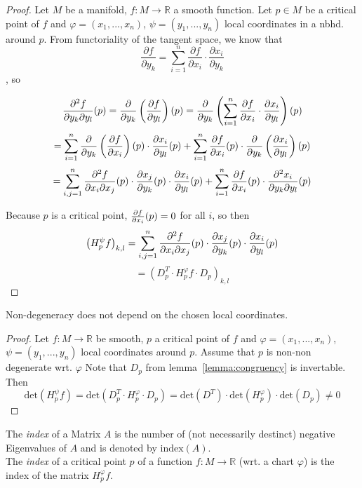 \documentclass[a4paper,11pt]{article}
\begin{document}
\begin{proof}

   Let $M$ be a manifold, $f: M \rightarrow \mathbb{R}$ a smooth function.
   Let $p \in M$ be a critical point of $f$ and $\varphi = (x_1, ..., x_n)$, $\psi = (y_1, ..., y_n)$
   local coordinates in a nbhd. around $p$.
   From functoriality of the tangent space, we know that 
   \[ \frac{\partial f}{\partial y_k} = \sum_{i=1}^n \frac{\partial f}{\partial x_i} \cdot \frac{\partial x_i}{\partial y_k} \]
   , so 

   \[ \pdderive[f]{y_k}{y_l} (p) 
   = \pderive{y_k} \left( \pderive[f]{y_l} \right) (p) 
   = \pderive{y_k} \left( \sum_{i=1}^n \pderive[f]{x_i} \cdot \pderive[x_i]{y_l} \right) (p) \]
   \[ = \sum_{i=1}^n \pderive{y_k} \left( \pderive[f]{x_i} \right) (p) \cdot \pderive[x_i]{y_l} (p) 
   + \sum_{i=1}^n \pderive[f]{x_i} (p) \cdot \pderive{y_k} \left( \pderive[x_i]{y_l} \right) (p) \]
   \[ = \sum_{i,j = 1}^n \pdderive[f]{x_i}{x_j} (p) \cdot \pderive[x_j]{y_k} (p) \cdot \pderive[x_i]{y_l}(p)
   + \sum_{i=1}^n \pderive[f]{x_i} (p) \cdot \pdderive[x_i]{y_k}{y_l}(p)\]
   
   Because $p$ is a critical point, $\pderive[f]{x_i} (p) = 0$ for all $i$, so then
   \[ \left( H_p^{\psi}f \right)_{k,l} = \sum_{i,j = 1}^n \pdderive[f]{x_i}{x_j} (p) \cdot \pderive[x_j]{y_k}(p) \cdot \pderive[x_i]{y_l} (p) \]
   \[ = \left( D_p^T \cdot H_p^{\varphi}f \cdot D_p \right)_{k,l} \]

\end{proof}

\begin{lemma} 
   \label{lemma:non-degeneracy}
   Non-degeneracy does not depend on the chosen local coordinates.
\end{lemma}

\begin{proof}
   Let $f: M \rightarrow \mathbb{R}$ be smooth, $p$ a critical point of $f$ and $\varphi = (x_1, ..., x_n)$, $\psi = (y_1, ..., y_n)$ 
   local coordinates around $p$. Assume that $p$ is non-non degenerate wrt. $\varphi$ Note that $D_p$ from lemma~\ref{lemma:congruency} is invertable. Then
   \[ \text{det}(H_p^{\psi}f) = \text{det}(D_p^T \cdot H_p^{\varphi} \cdot D_p) = \text{det}(D^T) \cdot \text{det}(H_p^{\varphi}) \cdot \text{det}(D_p) \neq 0 \]
\end{proof}

\begin{definition}[Index]
   \label{def:index}

   The \textit{index} of a Matrix $A$ is the number of (not necessarily destinct) negative Eigenvalues of $A$ and is denoted by
   $\text{index}(A)$. \\ The \textit{index} of a critical point $p$ of a function $f: M \rightarrow \mathbb{R}$ (wrt. a chart $\varphi$)
   is the index of the matrix $H_p^{\varphi}f$.
\end{definition}
\end{document}
